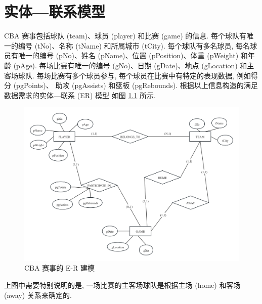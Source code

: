\documentclass[10pt,UTF8]{book} %
\begin{document}
\chapter{实体—联系模型}
\label{chap: ER model}

\begin{example}
    CBA 赛事包括球队 (team)、球员 (player) 和比赛 (game) 的信息. 
    每个球队有唯一的编号 (tNo)、名称 (tName) 和所属城市 (tCity).
    每个球队有多名球员, 每名球员有唯一的编号 (pNo)、姓名 (pName)、位置
    (pPosition)、体重 (pWeight) 和年龄 (pAge).
    每场比赛有唯一的编号 (gNo)、日期 (gDate)、地点 (gLocation) 和主客场球队.
    每场比赛有多个球员参与, 每个球员在比赛中有特定的表现数据, 例如得分 (pgPoints)、
    助攻 (pgAssists) 和篮板 (pgRebounds).
    根据以上信息构造的满足数据需求的实体—联系 (ER) 模型 
    如图 \ref{example-er:team-player-game} 所示.
    \begin{figure}[H]
        \centering
        \includegraphics*[width=\textwidth]{pic/CBA赛事.png}
        \caption{CBA 赛事的 E-R 建模}
        \label{example-er:team-player-game}
    \end{figure}
    上图中需要特别说明的是, 一场比赛的主客场球队是根据主场 (home) 和客场 (away)
    关系来确定的.
\end{example}
\end{document}
